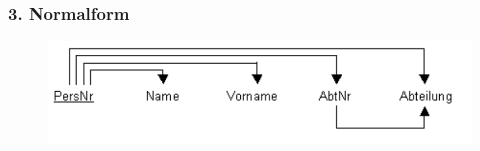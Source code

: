 \subsubsection{3. Normalform}
\begin{figure}[H]
    \centering
    \includegraphics[width=\textwidth]{res/themenkorb_3/normalization_pic7.png}
\end{figure}